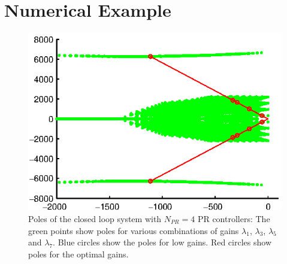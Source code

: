 \documentclass[conference,10pt]{IEEEtran}
\begin{document}
\section{Numerical Example}


\begin{figure}[!h]
\centering

\includegraphics{fig/root_locus}
\caption{Poles of the closed loop system with $N_{PR}=4$ PR controllers: The green points show poles for various combinations of gains $\lambda_1$, $\lambda_3$, $\lambda_5$ and $\lambda_7$. Blue circles show the poles for low gains. Red circles show poles for the optimal gains. }
\label{fig:PolesOptimalExample}
\end{figure}



\end{document}

